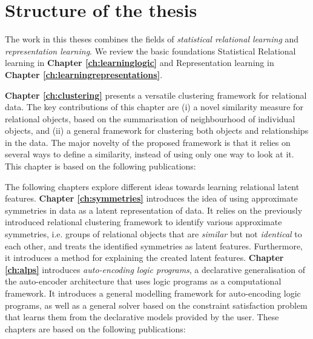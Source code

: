 



\section{Structure of the thesis}


The work in this theses combines the fields of \textit{statistical relational learning} and \textit{representation learning}.
We review the basic foundations Statistical Relational learning in \textbf{Chapter \ref{ch:learninglogic}} and Representation learning in \textbf{Chapter \ref{ch:learningrepresentations}}.


\textbf{Chapter \ref{ch:clustering}} presents a versatile clustering framework for relational data.
The key contributions of this chapter are (i) a novel similarity measure for relational objects, based on the summarisation of neighbourhood of individual objects, and (ii) a general framework for clustering both objects and relationships in the data.
The major novelty of the proposed framework is that it relies on several ways to define a similarity, instead of using only one way to look at it.
This chapter is based on the following publications:

\begin{quote}
\end{quote}

\begin{quote}
\end{quote}



The following chapters explore different ideas towards learning relational latent features.
\textbf{Chapter \ref{ch:symmetries}} introduces the idea of using approximate symmetries in data as a latent representation of data.
It relies on the previously introduced relational clustering framework to identify various approximate symmetries, i.e. groups of relational objects that are \textit{similar} but not \textit{identical} to each other, and treats the identified symmetries as latent features.
Furthermore, it introduces a method for explaining the created latent features.
\textbf{Chapter \ref{ch:alps}} introduces \textit{auto-encoding logic programs}, a declarative generalisation of the auto-encoder architecture \cite{Hinton504} that uses logic programs as a computational framework.
It introduces a general modelling framework for auto-encoding logic programs, as well as a general solver based on the constraint satisfaction problem that learns them from the declarative models provided by the user.
These chapters are based on the following publications:

